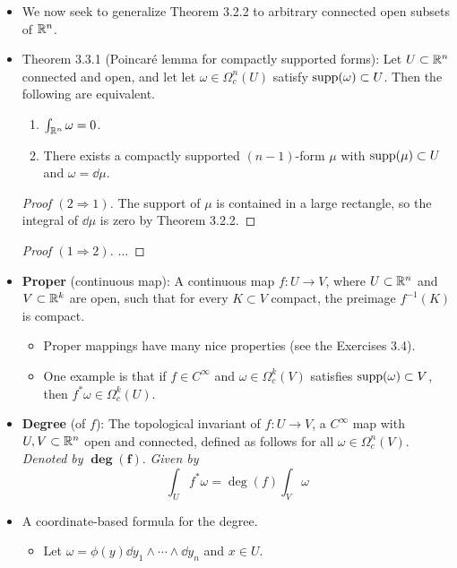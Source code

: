 \documentclass[../notes.tex]{subfiles}
\begin{document}
\begin{itemize}
\begin{proof}[Proof $(1\Rightarrow 2)$]
    \end{proof}
    \item We now seek to generalize Theorem 3.2.2 to arbitrary connected open subsets of $\mathbb{R}^n$.
    \item Theorem 3.3.1 (Poincar\'{e} lemma for compactly supported forms): Let $U\subset\mathbb{R}^n$ connected and open, and let let $\omega\in\Omega_c^n(U)$ satisfy $\operatorname{supp}(\omega)\subset U$. Then the following are equivalent.
    \begin{enumerate}
        \item $\int_{\mathbb{R}^n}\omega=0$.
        \item There exists a compactly supported $(n-1)$-form $\mu$ with $\operatorname{supp}(\mu)\subset U$ and $\omega=\dd{\mu}$.
    \end{enumerate}
    \begin{proof}[Proof $(2\Rightarrow 1)$]
        The support of $\mu$ is contained in a large rectangle, so the integral of $\dd{\mu}$ is zero by Theorem 3.2.2.
    \end{proof}
    \begin{proof}[Proof $(1\Rightarrow 2)$]
        ...
    \end{proof}
    \item \textbf{Proper} (continuous map): A continuous map $f:U\to V$, where $U\subset\mathbb{R}^n$ and $V\subset\mathbb{R}^k$ are open, such that for every $K\subset V$ compact, the preimage $f^{-1}(K)$ is compact.
    \begin{itemize}
        \item Proper mappings have many nice properties (see the Exercises 3.4).
        \item One example is that if $f\in C^\infty$ and $\omega\in\Omega_c^k(V)$ satisfies $\operatorname{supp}(\omega)\subset V$, then $f^*\omega\in\Omega_c^k(U)$.
    \end{itemize}
    \item \textbf{Degree} (of $f$): The topological invariant of $f:U\to V$, a $C^\infty$ map with $U,V\subset\mathbb{R}^n$ open and connected, defined as follows for all $\omega\in\Omega_c^n(V)$. \emph{Denoted by} $\bm{\deg(f)}$. \emph{Given by}
    \begin{equation*}
        \int_Uf^*\omega = \deg(f)\int_V\omega
    \end{equation*}
    \item A coordinate-based formula for the degree.
    \begin{itemize}
        \item Let $\omega=\phi(y)\dd{y_1}\wedge\cdots\wedge\dd{y_n}$ and $x\in U$.

\end{itemize}
\end{itemize}
\end{document}
